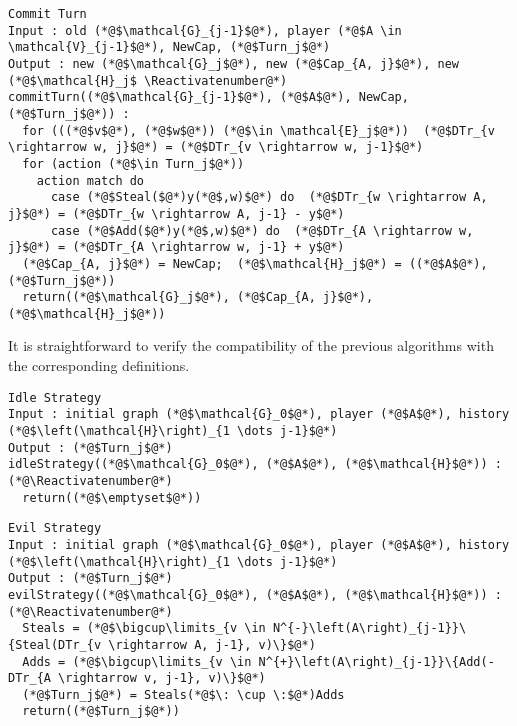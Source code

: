 \documentclass[11pt]{llncs}
\makeatletter
\newcommand*\Suppressnumber{%
  \lst@AddToHook{OnNewLine}{%
    \let\thelstnumber\relax%
     \advance\c@lstnumber-\@ne\relax%
    }%
}
\theoremstyle{definition}
\makeatother
\begin{document}
    \begin{lstlisting}[label=committurn, style=numbers]
Commit Turn
Input : old (*@$\mathcal{G}_{j-1}$@*), player (*@$A \in \mathcal{V}_{j-1}$@*), NewCap, (*@$Turn_j$@*)
Output : new (*@$\mathcal{G}_j$@*), new (*@$Cap_{A, j}$@*), new (*@$\mathcal{H}_j$ \Reactivatenumber@*)
commitTurn((*@$\mathcal{G}_{j-1}$@*), (*@$A$@*), NewCap, (*@$Turn_j$@*)) :
  for (((*@$v$@*), (*@$w$@*)) (*@$\in \mathcal{E}_j$@*))  (*@$DTr_{v \rightarrow w, j}$@*) = (*@$DTr_{v \rightarrow w, j-1}$@*)
  for (action (*@$\in Turn_j$@*))
    action match do
      case (*@$Steal($@*)y(*@$,w)$@*) do  (*@$DTr_{w \rightarrow A, j}$@*) = (*@$DTr_{w \rightarrow A, j-1} - y$@*)
      case (*@$Add($@*)y(*@$,w)$@*) do  (*@$DTr_{A \rightarrow w, j}$@*) = (*@$DTr_{A \rightarrow w, j-1} + y$@*)
  (*@$Cap_{A, j}$@*) = NewCap;  (*@$\mathcal{H}_j$@*) = ((*@$A$@*), (*@$Turn_j$@*))
  return((*@$\mathcal{G}_j$@*), (*@$Cap_{A, j}$@*), (*@$\mathcal{H}_j$@*))
    \end{lstlisting}
    It is straightforward to verify the compatibility of the previous algorithms with the corresponding definitions.

     \Suppressnumber
     \begin{lstlisting}[label=idlestrategy, style=numbers]
Idle Strategy
Input : initial graph (*@$\mathcal{G}_0$@*), player (*@$A$@*), history (*@$\left(\mathcal{H}\right)_{1 \dots j-1}$@*)
Output : (*@$Turn_j$@*)
idleStrategy((*@$\mathcal{G}_0$@*), (*@$A$@*), (*@$\mathcal{H}$@*)) : (*@\Reactivatenumber@*)
  return((*@$\emptyset$@*))
     \end{lstlisting}

     \Suppressnumber
     \begin{lstlisting}[label=evilstrategy, style=numbers]
Evil Strategy
Input : initial graph (*@$\mathcal{G}_0$@*), player (*@$A$@*), history (*@$\left(\mathcal{H}\right)_{1 \dots j-1}$@*)
Output : (*@$Turn_j$@*)
evilStrategy((*@$\mathcal{G}_0$@*), (*@$A$@*), (*@$\mathcal{H}$@*)) : (*@\Reactivatenumber@*)
  Steals = (*@$\bigcup\limits_{v \in N^{-}\left(A\right)_{j-1}}\{Steal(DTr_{v \rightarrow A, j-1}, v)\}$@*)
  Adds = (*@$\bigcup\limits_{v \in N^{+}\left(A\right)_{j-1}}\{Add(-DTr_{A \rightarrow v, j-1}, v)\}$@*)
  (*@$Turn_j$@*) = Steals(*@$\: \cup \:$@*)Adds
  return((*@$Turn_j$@*))
     \end{lstlisting}
\end{document}
